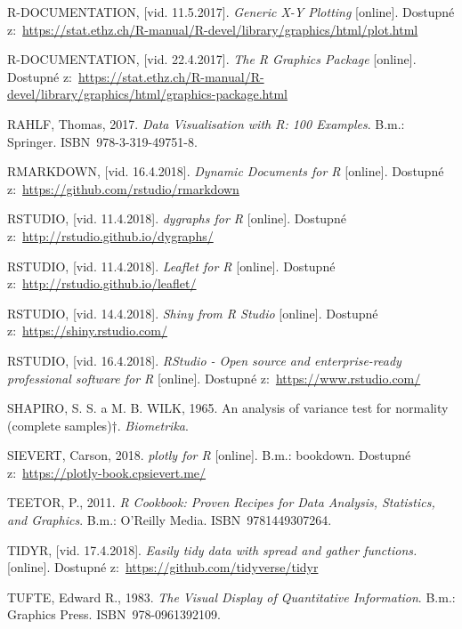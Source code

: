 \documentclass[12pt,]{article}
\begin{document}
\hypertarget{ref-plot}{}
R-DOCUMENTATION, {[}vid. 11.5.2017{]}. \emph{Generic X-Y Plotting}
{[}online{]}. Dostupné
z:~\url{https://stat.ethz.ch/R-manual/R-devel/library/graphics/html/plot.html}

\hypertarget{ref-graphics}{}
R-DOCUMENTATION, {[}vid. 22.4.2017{]}. \emph{The R Graphics Package}
{[}online{]}. Dostupné
z:~\url{https://stat.ethz.ch/R-manual/R-devel/library/graphics/html/graphics-package.html}

\hypertarget{ref-datavis_rahlf}{}
RAHLF, Thomas, 2017. \emph{Data Visualisation with R: 100 Examples}.
B.m.: Springer. ISBN~978-3-319-49751-8.

\hypertarget{ref-rmarkdown}{}
RMARKDOWN, {[}vid. 16.4.2018{]}. \emph{Dynamic Documents for R}
{[}online{]}. Dostupné z:~\url{https://github.com/rstudio/rmarkdown}

\hypertarget{ref-dygraphs}{}
RSTUDIO, {[}vid. 11.4.2018{]}. \emph{dygraphs for R} {[}online{]}.
Dostupné z:~\url{http://rstudio.github.io/dygraphs/}

\hypertarget{ref-leaflet}{}
RSTUDIO, {[}vid. 11.4.2018{]}. \emph{Leaflet for R} {[}online{]}.
Dostupné z:~\url{http://rstudio.github.io/leaflet/}

\hypertarget{ref-shiny}{}
RSTUDIO, {[}vid. 14.4.2018{]}. \emph{Shiny from R Studio} {[}online{]}.
Dostupné z:~\url{https://shiny.rstudio.com/}

\hypertarget{ref-rstudio}{}
RSTUDIO, {[}vid. 16.4.2018{]}. \emph{RStudio - Open source and
enterprise-ready professional software for R} {[}online{]}. Dostupné
z:~\url{https://www.rstudio.com/}

\hypertarget{ref-SW_test}{}
SHAPIRO, S. S. a M. B. WILK, 1965. An analysis of variance test for
normality (complete samples)†. \emph{Biometrika}.

\hypertarget{ref-plotly}{}
SIEVERT, Carson, 2018. \emph{plotly for R} {[}online{]}. B.m.: bookdown.
Dostupné z:~\url{https://plotly-book.cpsievert.me/}

\hypertarget{ref-teetor2011}{}
TEETOR, P., 2011. \emph{R Cookbook: Proven Recipes for Data Analysis,
Statistics, and Graphics}. B.m.: O'Reilly Media. ISBN~9781449307264.

\hypertarget{ref-tidyr}{}
TIDYR, {[}vid. 17.4.2018{]}. \emph{Easily tidy data with spread and
gather functions.} {[}online{]}. Dostupné
z:~\url{https://github.com/tidyverse/tidyr}

\hypertarget{ref-tufte1983}{}
TUFTE, Edward R., 1983. \emph{The Visual Display of Quantitative
Information}. B.m.: Graphics Press. ISBN~978-0961392109.
\end{document}
